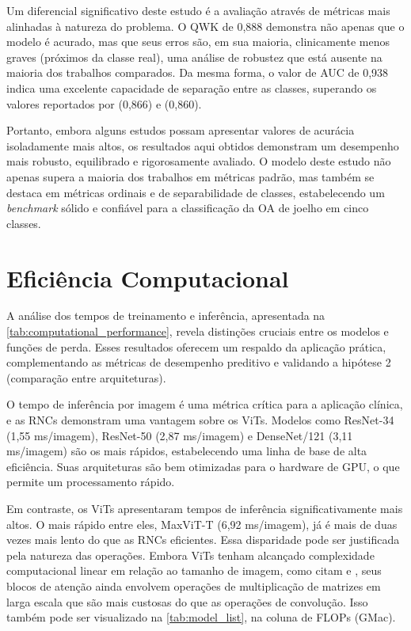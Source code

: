 Um diferencial significativo deste estudo é a avaliação através de métricas mais alinhadas à natureza do problema. O QWK de 0,888 demonstra não apenas que o modelo é acurado, mas que seus erros são, em sua maioria, clinicamente menos graves (próximos da classe real), uma análise de robustez que está ausente na maioria dos trabalhos comparados. Da mesma forma, o valor de AUC de 0,938 indica uma excelente capacidade de separação entre as classes, superando os valores reportados por  (0,866) e  (0,860).

Portanto, embora alguns estudos possam apresentar valores de acurácia isoladamente mais altos, os resultados aqui obtidos demonstram um desempenho mais robusto, equilibrado e rigorosamente avaliado. O modelo deste estudo não apenas supera a maioria dos trabalhos em métricas padrão, mas também se destaca em métricas ordinais e de separabilidade de classes, estabelecendo um \textit{benchmark} sólido e confiável para a classificação da OA de joelho em cinco classes.

\section{Eficiência Computacional}

A análise dos tempos de treinamento e inferência, apresentada na \autoref{tab:computational_performance}, revela distinções cruciais entre os modelos e funções de perda. Esses resultados oferecem um respaldo da aplicação prática, complementando as métricas de desempenho preditivo e validando a hipótese 2 (comparação entre arquiteturas).

O tempo de inferência por imagem é uma métrica crítica para a aplicação clínica, e as RNCs demonstram uma vantagem sobre os ViTs. Modelos como ResNet-34 (1,55 ms/imagem), ResNet-50 (2,87 ms/imagem) e DenseNet/121 (3,11 ms/imagem) são os mais rápidos, estabelecendo uma linha de base de alta eficiência. Suas arquiteturas são bem otimizadas para o hardware de GPU, o que permite um processamento rápido.

Em contraste, os ViTs apresentaram tempos de inferência significativamente mais altos. O mais rápido entre eles, MaxViT-T (6,92 ms/imagem), já é mais de duas vezes mais lento do que as RNCs eficientes. Essa disparidade pode ser justificada pela natureza das operações. Embora ViTs tenham alcançado complexidade computacional linear em relação ao tamanho de imagem, como citam  e , seus blocos de atenção ainda envolvem operações de multiplicação de matrizes em larga escala que são mais custosas do que as operações de convolução. Isso também pode ser visualizado na \autoref{tab:model_list}, na coluna de FLOPs (GMac).


